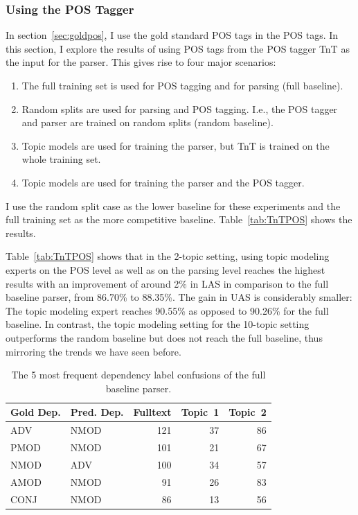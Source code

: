 \subsubsection{Using the POS Tagger}\label{TnTPOSinParsing}

In section~\ref{sec:goldpos}, I use the gold standard POS tags in the POS tags. In this section, I explore the results of using POS tags from the POS tagger TnT as the input for the parser. This gives rise to four major scenarios:

\begin{enumerate}
	\item The full training set is used for POS tagging and for parsing (full baseline).
	\item Random splits are used for parsing and POS tagging. I.e., the POS tagger and parser are trained on random splits (random baseline).
	\item Topic models are used for training the parser, but TnT is trained on the whole training set.\label{S2}
	\item Topic models are used for training the parser and the POS tagger. \label{S1}
\end{enumerate}

I use the random split case as the lower baseline for these experiments and the full training set as the more competitive baseline. Table~\ref{tab:TnTPOS} shows the results.


Table~\ref{tab:TnTPOS}  shows that in the 2-topic setting, using topic modeling experts on the POS level as well as on the parsing level reaches the highest results with an improvement of around 2\% in LAS in comparison to the full baseline parser, from 86.70\% to 88.35\%. The gain in UAS is considerably smaller: The topic modeling expert reaches 90.55\% as opposed to 90.26\% for the full baseline. In contrast, the topic modeling setting for the 10-topic setting outperforms the random baseline but does not reach the full baseline,  thus mirroring the trends we have seen before.

\begin{table}[t!]
\centering
\begin{tabular}{ll|rrr}

Gold Dep. & Pred. Dep. & Fulltext  &Topic~1  & Topic~2 \\ \hline
ADV & NMOD & 121 & 37 & 86\\
PMOD & NMOD & 101 & 21& 67\\
NMOD & ADV & 100 & 34 & 57 \\
AMOD & NMOD & 91 & 26 & 83\\
CONJ & NMOD & 86 & 13 & 56\\ \hline
\end{tabular}
\caption{The 5 most frequent dependency label confusions of the full baseline parser.}
\label{tab:conf:FT:TM}
\end{table}


